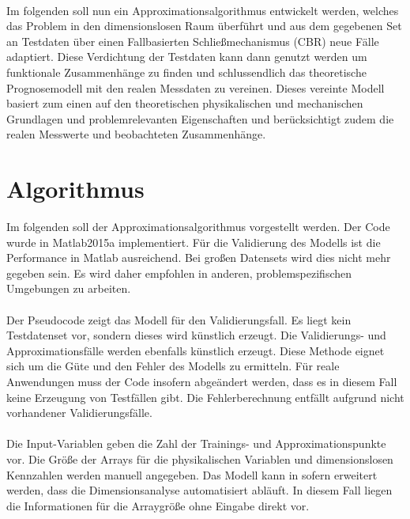\parskip 12pt \\
Im folgenden soll nun ein Approximationsalgorithmus entwickelt werden, welches das Problem in den dimensionslosen Raum überführt und aus dem gegebenen Set an Testdaten über einen Fallbasierten Schließmechanismus (CBR) neue Fälle adaptiert. Diese Verdichtung der Testdaten kann dann genutzt werden um funktionale Zusammenhänge zu finden und schlussendlich das theoretische Prognosemodell mit den realen Messdaten zu vereinen. Dieses vereinte Modell basiert zum einen auf den theoretischen physikalischen und mechanischen Grundlagen und problemrelevanten Eigenschaften und berücksichtigt zudem die realen Messwerte und beobachteten Zusammenhänge.

\section{Algorithmus}
\label{sec:Algorithmus}

Im folgenden soll der Approximationsalgorithmus vorgestellt werden. Der Code wurde in Matlab2015a implementiert. Für die Validierung des Modells ist die Performance in Matlab ausreichend. Bei großen Datensets wird dies nicht mehr gegeben sein. Es wird daher empfohlen in anderen, problemspezifischen Umgebungen zu arbeiten. \\
\parskip 12pt \\
Der Pseudocode zeigt das Modell für den Validierungsfall. Es liegt kein Testdatenset vor, sondern dieses wird künstlich erzeugt. Die Validierungs- und Approximationsfälle werden ebenfalls künstlich erzeugt. Diese Methode eignet sich um die Güte und den Fehler des Modells zu ermitteln. Für reale Anwendungen muss der Code insofern abgeändert werden, dass es in diesem Fall keine Erzeugung von Testfällen gibt. Die Fehlerberechnung entfällt aufgrund nicht vorhandener Validierungsfälle.\\
\parskip 12pt \\
Die Input-Variablen geben die Zahl der Trainings- und Approximationspunkte vor. Die Größe der Arrays für die physikalischen Variablen und dimensionslosen Kennzahlen werden manuell angegeben. Das Modell kann in sofern erweitert werden, dass die Dimensionsanalyse automatisiert abläuft. In diesem Fall liegen die Informationen für die Arraygröße ohne Eingabe direkt vor.

